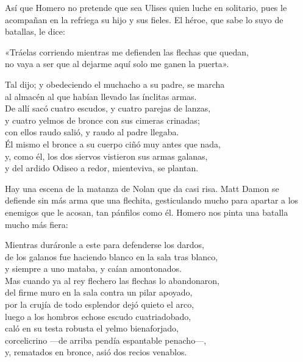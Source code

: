 Así que Homero no pretende que sea Ulises quien luche en solitario, pues le acompañan en la refriega su hijo y sus fieles. El héroe, que sabe lo suyo de batallas, le dice:

\begin{versocita}
«Tráelas corriendo mientras me defienden las flechas que quedan,\\
no vaya a ser que al dejarme aquí solo me ganen la puerta».
\end{versocita}

\begin{versocita}
Tal dijo; y obedeciendo el muchacho a su padre, se marcha\\
al almacén al que habían llevado las ínclitas armas.\\
De allí sacó cuatro escudos, y cuatro parejas de lanzas,\\
y cuatro yelmos de bronce con sus cimeras crinadas;\\
con ellos raudo salió, y raudo al padre llegaba.\\
Él mismo el bronce a su cuerpo ciñó muy antes que nada,\\
y, como él, los dos siervos vistieron sus armas galanas,\\
y del ardido Odiseo a redor, mienteviva, se plantan.
\end{versocita}

Hay una escena de la matanza de Nolan que da casi risa. Matt Damon se defiende sin más arma que una flechita, gesticulando mucho para apartar a los enemigos que le acosan, tan pánfilos como él. Homero nos pinta una batalla mucho más fiera:

\begin{versocita}
Mientras duráronle a este para defenderse los dardos,\\
de los galanos fue haciendo blanco en la sala tras blanco,\\
y siempre a uno mataba, y caían amontonados.\\
Mas cuando ya al rey flechero las flechas lo abandonaron,\\
del firme muro en la sala contra un pilar apoyado,\\
por la crujía de todo esplendor dejó quieto el arco,\\
luego a los hombros echose escudo cuatriadobado,\\
caló en su testa robusta el yelmo bienaforjado,\\
corcelicrino ---de arriba pendía espantable penacho---,\\
y, rematados en bronce, asió dos recios venablos.
\end{versocita}

